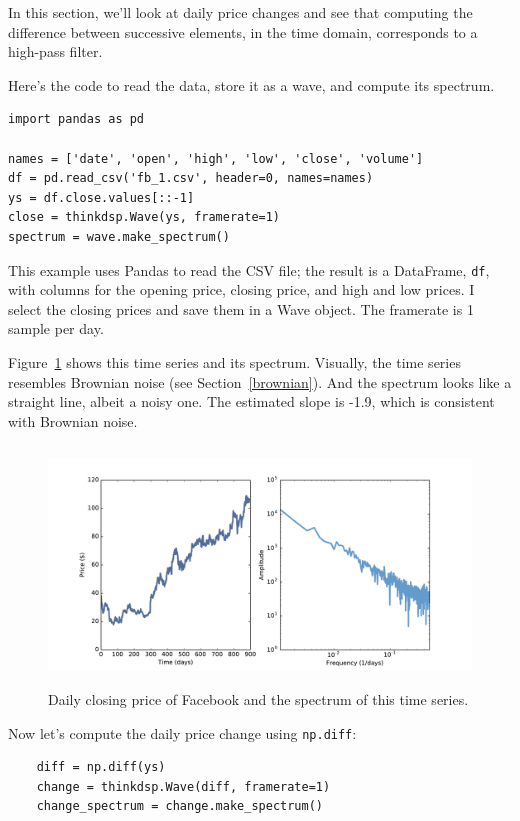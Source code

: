 \documentclass[12pt]{book}
\begin{document}
In this section, we'll look at daily price changes and
see that computing the difference between successive elements,
in the time domain, corresponds to a high-pass filter.

Here's the code to read the data, store it as a wave, and compute its
spectrum.

\begin{verbatim}
import pandas as pd

names = ['date', 'open', 'high', 'low', 'close', 'volume']
df = pd.read_csv('fb_1.csv', header=0, names=names)
ys = df.close.values[::-1]
close = thinkdsp.Wave(ys, framerate=1)
spectrum = wave.make_spectrum()
\end{verbatim}

This example uses Pandas to read the CSV file; the
result is a DataFrame, {\tt df}, with columns for the opening
price, closing price, and high and low prices.  I select the closing
prices and save them in a Wave object.
The framerate is 1 sample per day.

Figure~\ref{fig.diff_int1} shows
this time series and its spectrum.
Visually, the time series resembles Brownian noise (see
Section~\ref{brownian}).
And the spectrum looks like a straight
line, albeit a noisy one.  The estimated slope is -1.9,
which is consistent with Brownian noise.

\begin{figure}
\centerline{\includegraphics[height=2.5in]{figs/diff_int1.pdf}}
\caption{Daily closing price of Facebook and the spectrum of this time
  series.}
\label{fig.diff_int1}
\end{figure}

Now let's compute the daily price change using {\tt np.diff}:

\begin{verbatim}
    diff = np.diff(ys)
    change = thinkdsp.Wave(diff, framerate=1)
    change_spectrum = change.make_spectrum()
\end{verbatim}
\end{document}
